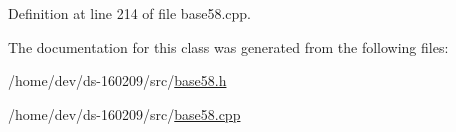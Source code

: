 Definition at line 214 of file base58.\+cpp.



The documentation for this class was generated from the following files\+:\begin{DoxyCompactItemize}
\item 
/home/dev/ds-\/160209/src/\hyperlink{base58_8h}{base58.\+h}\item 
/home/dev/ds-\/160209/src/\hyperlink{base58_8cpp}{base58.\+cpp}\end{DoxyCompactItemize}
